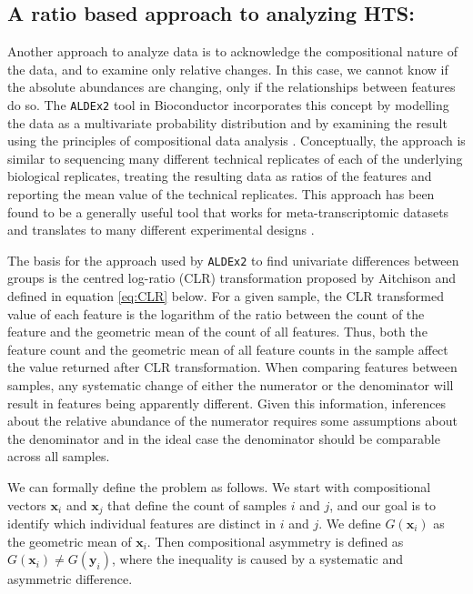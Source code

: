 \documentclass[graybox]{svmult}
\begin{document}
\subsection*{A ratio based approach to analyzing HTS:}
\label{subsec:1:1}
Another approach to analyze data is to acknowledge the compositional nature of the data, and to examine only relative changes. In this case, we cannot know if the absolute abundances are changing, only if the relationships between features do so. The \texttt{ALDEx2} tool in Bioconductor incorporates this concept by modelling the data as a multivariate probability distribution and by examining the result using the principles of compositional data analysis \cite{Aitchison:1986,fernandes:2013}. Conceptually, the approach is similar to sequencing many different technical replicates of each of the underlying biological replicates, treating the resulting data as ratios of the features and reporting the mean value of the technical replicates. This approach has been found to be a generally useful tool that works for meta-transcriptomic datasets \cite{macklaim:2013} and translates to many different experimental designs \cite{fernandes:2014, mcmurrough:2014,gloorFrontiers:2017,Macklaim:2018aa,Almeida:2019aa}. 

The basis for the approach used by \texttt{ALDEx2} to find univariate differences between groups is the centred log-ratio (CLR) transformation proposed by Aitchison \cite{Aitchison:1986} and defined in equation \ref{eq:CLR} below.  For a given sample, the CLR transformed value of each feature is the logarithm of the ratio between the count of the feature and the geometric mean of the count of all features. Thus, both the feature count and the geometric mean of  all feature counts in the sample affect the value returned after CLR transformation. When comparing features between samples, any systematic change  of either the numerator or the denominator will result in features being apparently different. Given this information, inferences about the relative abundance of the numerator requires some assumptions about the denominator and in the ideal case the denominator should be comparable across all samples. 

We can formally define the problem as follows. We start with compositional vectors $\textbf{x}_i$ and $\textbf{x}_j$ that define the count of samples $i$ and $j$, and our goal is to identify which individual features are distinct in $i$ and $j$. We define $G(\textbf{x}_i)$ as the geometric mean of $\textbf{x}_i$. Then compositional asymmetry is defined as  $G(\textbf{x}_i) \ne G(\textbf{y}_i)$, where the inequality is caused by a systematic and asymmetric difference. 
\end{document}
